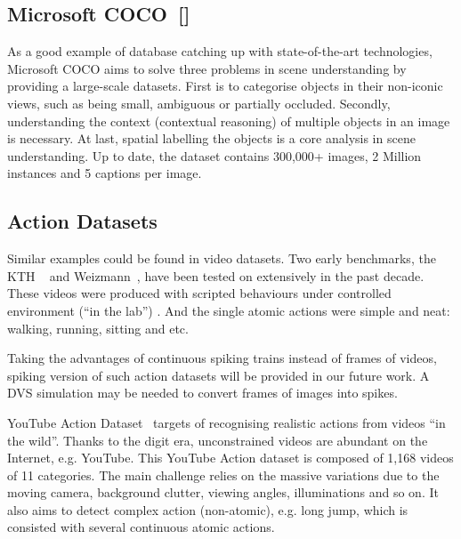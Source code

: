 \subsection{Microsoft COCO~[\cite{lin_microsoft_2014}]}
As a good example of database catching up with state-of-the-art technologies, Microsoft COCO aims to solve three problems in scene understanding by providing a large-scale datasets.
First is to categorise objects in their non-iconic views, such as being small, ambiguous or partially occluded.
Secondly, understanding the context (contextual reasoning) of multiple objects in an image is necessary.
At last, spatial labelling the objects is a core analysis in scene understanding.
Up to date, the dataset contains 300,000+ images, 2 Million instances and 5 captions per image.

\subsection{Action Datasets}
Similar examples could be found in video datasets.
Two early benchmarks, the KTH ~\cite{schuldt2004recognizing} and Weizmann~\cite{blank2005actions}, have been tested on extensively in the past decade. 
These videos were produced with scripted behaviours under controlled environment (``in the lab'') .
And the single atomic actions were simple and neat: walking, running, sitting and etc.

Taking the advantages of continuous spiking trains instead of frames of videos, spiking version of such action datasets will be provided in our future work.
A DVS simulation may be needed to convert frames of images into spikes.
 
YouTube Action Dataset~\cite{liu_recognizing_2009} targets of recognising realistic actions from videos ``in the wild''.
Thanks to the digit era, unconstrained videos are abundant on the Internet, e.g. YouTube.
This YouTube Action dataset is composed of 1,168 videos of 11 categories.
The main challenge relies on the massive variations due to the moving camera, background clutter, viewing angles, illuminations and so on.
It also aims to detect complex action (non-atomic), e.g. long jump, which is consisted with several continuous atomic actions.

